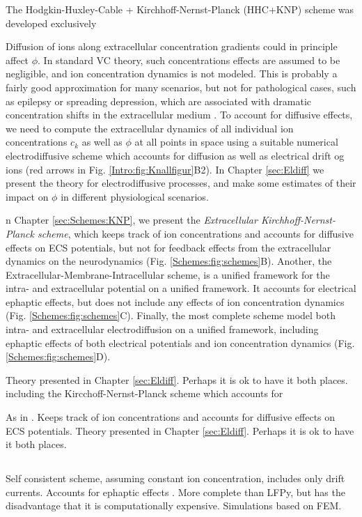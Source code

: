 {The Hodgkin-Huxley-Cable + Kirchhoff-Nernst-Planck (HHC+KNP) scheme was developed exclusively 


Diffusion of ions along extracellular concentration gradients could in principle affect $\phi$. In standard VC theory, such concentrations effects are assumed to be negligible, and ion concentration dynamics is not modeled. This is probably a fairly good approximation for many scenarios, but not for pathological cases, such as epilepsy or spreading depression, which are associated with dramatic concentration shifts in the extracellular medium \cite{Somjen2001, Frohlich2008, Zandt2015review, Ayata2015}. To account for diffusive effects, we need to compute the extracellular dynamics of all individual ion concentrations $c_k$ as well as $\phi$ at all points in space using a suitable numerical electrodiffusive scheme which accounts for diffusion as well as electrical drift og ions (red arrows in Fig. \ref{Intro:fig:Knallfigur}B2). In Chapter \ref{sec:Eldiff} we present the theory for electrodiffusive processes, and make some estimates of their impact on $\phi$ in different physiological scenarios. 

n Chapter \ref{sec:Schemes:KNP}, we present the \textit{Extracellular Kirchhoff-Nernst-Planck scheme}, which keeps track of ion concentrations and accounts for diffusive effects on ECS potentials, but not for feedback effects from the extracellular dynamics on the neurodynamics  (Fig. \ref{Schemes:fig:schemes}B). Another, the Extracellular-Membrane-Intracellular scheme, is a unified framework for the intra- and extracellular potential on a unified framework. It accounts for electrical ephaptic effects, but does not include any effects of ion concentration dynamics (Fig. \ref{Schemes:fig:schemes}C). Finally, the most complete scheme model both intra- and extracellular electrodiffusion on a unified framework, including ephaptic effects of both electrical potentials and ion concentration dynamics  (Fig. \ref{Schemes:fig:schemes}D).

Theory presented in Chapter \ref{sec:Eldiff}. Perhaps it is ok to have it both places. 
including the Kircchoff-Nernst-Planck scheme which accounts for 



As in \cite{Solbra2018}. Keeps track of ion concentrations and accounts for diffusive effects on ECS potentials. Theory presented in Chapter \ref{sec:Eldiff}. Perhaps it is ok to have it both places. 




\subsection{}
Self consistent scheme, assuming constant ion concentration, includes only drift currents. Accounts for ephaptic effects \cite{Tveito2019}. More complete than LFPy, but has the disadvantage that it is computationally expensive. Simulations based on FEM.



}
